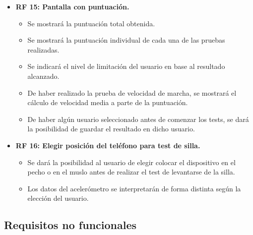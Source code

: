 \begin{itemize}
    \item \textbf{RF 15: Pantalla con puntuación.} 
    \begin{itemize}
        \item Se mostrará la puntuación total obtenida.
        \item Se mostrará la puntuación individual de cada una de las pruebas realizadas.
        \item Se indicará el nivel de limitación del usuario en base al resultado alcanzado.
        \item De haber realizado la prueba de velocidad de marcha, se mostrará el cálculo de velocidad media a parte de la puntuación.
        \item De haber algún usuario seleccionado antes de comenzar los tests, se dará la posibilidad de guardar el resultado en dicho usuario.
    \end{itemize}
    
    \item \textbf{RF 16: Elegir posición del teléfono para test de silla.} 
    \begin{itemize}
        \item Se dará la posibilidad al usuario de elegir colocar el dispositivo en el pecho o en el muslo antes de realizar el test de levantarse de la silla.
        \item Los datos del acelerómetro se interpretarán de forma distinta según la elección del usuario.
    \end{itemize}
\end{itemize}

\newpage

\subsection{Requisitos no funcionales}

